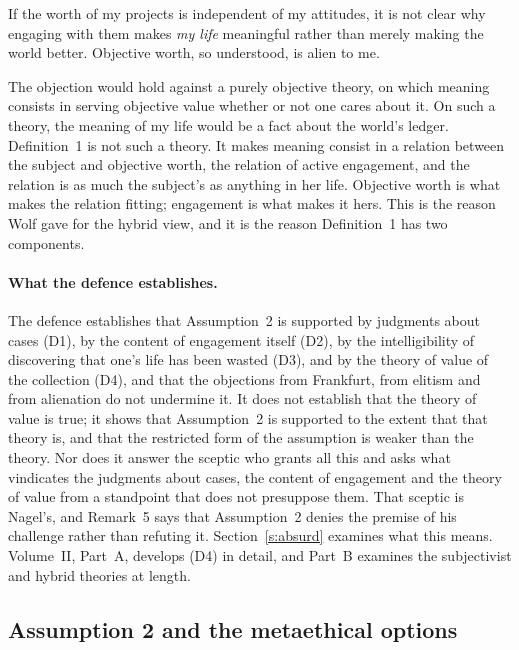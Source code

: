 \begin{objection}[Alienation]\label{o:alien}
If the worth of my projects is independent of my attitudes, it is not clear why engaging with them makes \emph{my life} meaningful rather than merely making the world better. Objective worth, so understood, is alien to me.
\end{objection}

\begin{reply}
The objection would hold against a purely objective theory, on which meaning consists in serving objective value whether or not one cares about it. On such a theory, the meaning of my life would be a fact about the world's ledger. Definition~1 is not such a theory. It makes meaning consist in a relation between the subject and objective worth, the relation of active engagement, and the relation is as much the subject's as anything in her life. Objective worth is what makes the relation fitting; engagement is what makes it hers. This is the reason Wolf gave for the hybrid view, and it is the reason Definition~1 has two components.
\end{reply}

\paragraph{What the defence establishes.} The defence establishes that Assumption~2 is supported by judgments about cases (D1), by the content of engagement itself (D2), by the intelligibility of discovering that one's life has been wasted (D3), and by the theory of value of the collection (D4), and that the objections from Frankfurt, from elitism and from alienation do not undermine it. It does not establish that the theory of value is true; it shows that Assumption~2 is supported to the extent that that theory is, and that the restricted form of the assumption is weaker than the theory. Nor does it answer the sceptic who grants all this and asks what vindicates the judgments about cases, the content of engagement and the theory of value from a standpoint that does not presuppose them. That sceptic is Nagel's, and Remark~5 says that Assumption~2 denies the premise of his challenge rather than refuting it. Section~\ref{s:absurd} examines what this means. Volume~II, Part~A, develops (D4) in detail, and Part~B examines the subjectivist and hybrid theories at length.

\subsection{Assumption 2 and the metaethical options}\label{s:metaeth}

